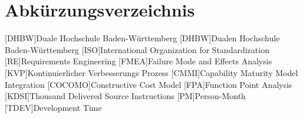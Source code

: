 \section*{Abkürzungsverzeichnis}
\begin{acronym}
  [DHBW]{Duale Hochschule Ba\-den-\-Würt\-tem\-berg}
  [DHBW]{Dualen Hochschule Ba\-den-\-Würt\-tem\-berg}
  [ISO]{International Organization for Standardization}
  [RE]{Requirements Engineering}
  [FMEA]{Failure Mode and Effects Analysis}
  [KVP]{Kontinuierlicher Verbesserungs Prozess}
  [CMMI]{Capability Maturity Model Integration}
  [COCOMO]{Constructive Cost Model}
  [FPA]{Function Point Analysis}
  [KDSI]{Thousand Delivered Source Instructions}
  [PM]{Person-Month}
  [TDEV]{Development Time}
\end{acronym}
\newpage